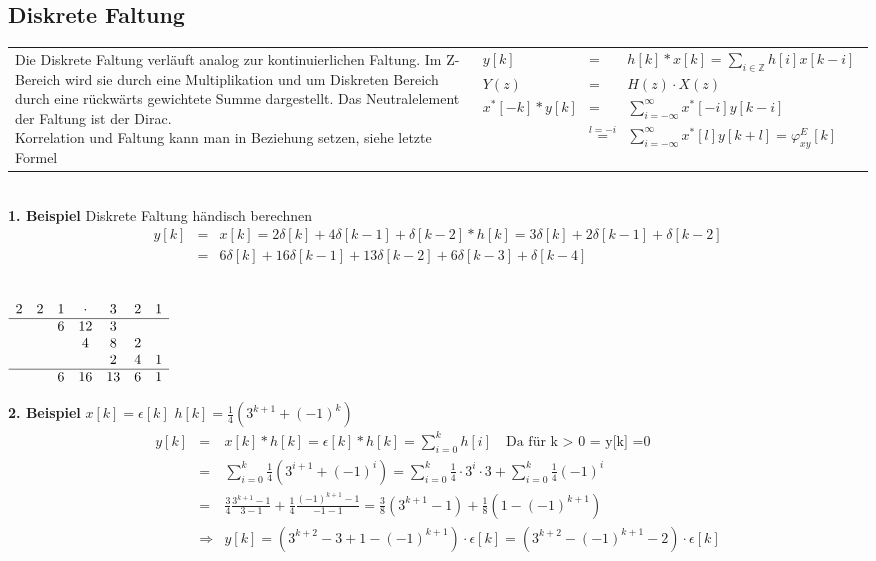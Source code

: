 \subsection{Diskrete Faltung}
\begin{tabular}{ll}
 \addtolength{\jot}{2mm}
 \parbox{5cm}{Die Diskrete Faltung verläuft analog zur kontinuierlichen Faltung. Im Z-Bereich wird sie durch eine Multiplikation und um Diskreten Bereich durch eine rückwärts gewichtete Summe dargestellt. Das Neutralelement der Faltung ist der Dirac.\\
 Korrelation und Faltung kann man in Beziehung setzen, siehe letzte Formel}
 &
 \addtolength{\jot}{2mm}
 \parbox{5cm}{
 \begin{eqnarray*}
 y[k] &=& h[k] \ast x[k] = \sum_{i \in \mathbb{Z}} h[i]x[k-i]\\
 Y(z) &=& H(z) \cdot X(z)\\
 x^*[-k] \ast y[k] &=& \sum_{i=-\infty}^{\infty} x^*[-i]y[k-i]\\ &\overset{l = -i}{=}& \sum_{i=-\infty}^{\infty} x^*[l]y[k+l] = \varphi^E_{xy}[k]
 \end{eqnarray*}
}
\end{tabular}\\
\vspace{6pt}
\textbf{1. Beispiel} \quad Diskrete Faltung händisch berechnen
\begin{eqnarray*}
y[k] &=& x[k] = 2\delta[k] + 4\delta[k-1] + \delta[k-2] \ast h[k] = 3 \delta[k] + 2\delta[k-1]+\delta[k-2]\\[6pt]
&=& 6\delta[k] + 16\delta[k-1] + 13\delta[k-2] + 6 \delta[k-3] + \delta[k-4]
\end{eqnarray*}\\
\begin{center}
$\begin{array}{ccccccc}
2&2&1&\cdot&3&2&1\\ 
\hline
&&6&12&3\\    
&&&4&8&2\\
&&&&2&4&1\\
\hline              
&&6&16&13&6&1
\end{array}$
\end{center}
\vspace{6pt}
\textbf{2. Beispiel} \quad $x[k] = \epsilon[k]$ \quad $h[k] = \frac{1}{4}(3^{k+1}+(-1)^k)$
\begin{eqnarray*}
y[k] &=& x[k] \ast h[k] = \epsilon[k] \ast h[k] = \sum_{i=0}^k h[i] \quad \text{Da für k > 0 = y[k] =0}\\
&=&  \sum_{i=0}^k \frac{1}{4}(3^{i+1}+(-1)^i) = \sum_{i=0}^k \frac{1}{4} \cdot 3^i \cdot 3 + \sum_{i=0}^k \frac{1}{4} (-1)^i\\[6pt]
&=& \frac{3}{4} \frac{3^{k+1}-1}{3-1} + \frac{1}{4} \frac{(-1)^{k+1}-1}{-1-1} = \frac{3}{8} (3^{k+1}-1) + \frac{1}{8} (1-(-1)^{k+1}) \\[6pt]
&\Rightarrow& y[k] = (3^{k+2}-3+1-(-1)^{k+1}) \cdot \epsilon[k] = (3^{k+2}-(-1)^{k+1}-2) \cdot \epsilon[k] 
\end{eqnarray*}\\
\vfill\columnbreak
